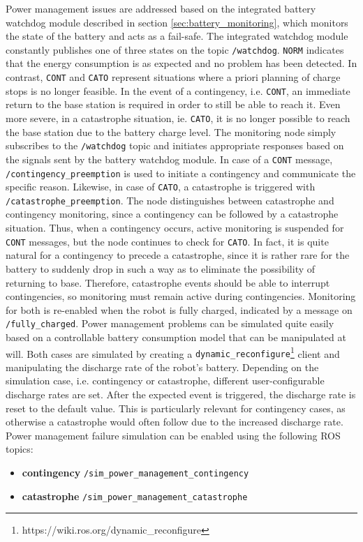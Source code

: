 \documentclass[english, master, utf8]{base/thesis_KBS}
\newcommand{\code}[1]{\colorbox{light-gray}{\texttt{#1}}}
\begin{document}
Power management issues are addressed based on the integrated battery watchdog module described in section \ref{sec:battery_monitoring}, which monitors the state of the battery
and acts as a fail-safe. The integrated watchdog module constantly publishes one of three states on the topic \code{/watchdog}. \code{NORM} indicates that the energy consumption is
as expected and no problem has been detected. In contrast, \code{CONT} and \code{CATO} represent situations where a priori planning of charge stops is no longer feasible. In the
event of a contingency, i.e. \code{CONT}, an immediate return to the base station is required in order to still be able to reach it. Even more severe, in a catastrophe situation, ie.
\code{CATO}, it is no longer possible to reach the base station due to the battery charge level. The monitoring node simply subscribes to the \code{/watchdog} topic and initiates
appropriate responses based on the signals sent by the battery watchdog module. In case of a \code{CONT} message, \code{/contingency\_preemption} is used to initiate a contingency
and communicate the specific reason. Likewise, in case of \code{CATO}, a catastrophe is triggered with \code{/catastrophe\_preemption}. The node distinguishes between catastrophe
and contingency monitoring, since a contingency can be followed by a catastrophe situation. Thus, when a contingency occurs, active monitoring is suspended for \code{CONT} messages,
but the node continues to check for \code{CATO}. In fact, it is quite natural for a contingency to precede a catastrophe, since it is rather rare for the battery to suddenly drop in
such a way as to eliminate the possibility of returning to base. Therefore, catastrophe events should be able to interrupt contingencies, so monitoring must remain active during
contingencies. Monitoring for both is re-enabled when the robot is fully charged, indicated by a message on \code{/fully\_charged}.\newline
Power management problems can be simulated quite easily based on a controllable battery consumption model that can be manipulated at will. Both cases are simulated by creating a
\code{dynamic\_reconfigure}\footnote{https://wiki.ros.org/dynamic\_reconfigure} client and manipulating the discharge rate of the robot's battery. Depending on the simulation case, i.e. contingency or catastrophe, different
user-configurable discharge rates are set. After the expected event is triggered, the discharge rate is reset to the default value. This is particularly relevant for contingency
cases, as otherwise a catastrophe would often follow due to the increased discharge rate. Power management failure simulation can be enabled using the following ROS topics:
\begin{itemize}
    \item \textbf{contingency} \textrightarrow \code{/sim\_power\_management\_contingency}
    \item \textbf{catastrophe} \textrightarrow \code{/sim\_power\_management\_catastrophe}
\end{itemize}
\end{document}
